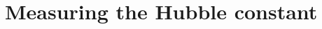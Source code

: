 \documentclass{beamer}
\begin{document}
%
%
%
%
%
%
%
%
%
%
%
%
%



\section{Measuring the Hubble constant}
\end{document}
